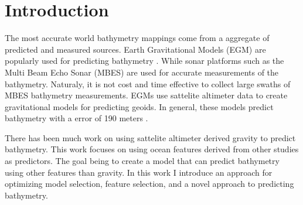 \section{Introduction}
\setlength{\parindent}{10ex}
The most accurate world bathymetry mappings come from a aggregate of predicted and measured sources. 
Earth Gravitational Models (EGM) are popularly used for predicting bathymetry \cite{becker2009global}\cite{smith1994bathymetric}\cite{smith1997global}\cite{smith2010planning}.
While sonar platforms such as the Multi Beam Echo Sonar (MBES) \cite{farr1980multibeam} are used for accurate measurements of the bathymetry.
Naturaly, it is not cost and time effective to collect large swaths of MBES bathymetry measurements.
EGMs use sattelite altimeter data to create gravitational models for predicting geoids.
In general, these models predict bathymetry with a error of 190 meters \cite{jena2012prediction}.

\par
There has been much work on using sattelite altimeter derived gravity to predict bathymetry.
This work focuses on using ocean features derived from other studies as predictors.
The goal being to create a model that can predict bathymetry using other features than gravity.
In this work I introduce an approach for optimizing model selection, feature selection, and a novel approach to predicting bathymetry.